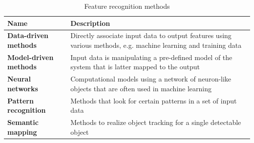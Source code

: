 \begin{table}[htbp]
  \centering
  \caption{Feature recognition methods}
    \begin{tabular}{lp{7cm}}
    \toprule
    \textbf{Name} & \textbf{Description} \\
    \midrule
    \textbf{Data-driven  methods} & Directly associate input data to output features using various methods, e.g. machine learning and training data \\
    \textbf{Model-driven methods} & Input data is manipulating a pre-defined model of the system that is latter mapped to the output \\
    \textbf{Neural networks} & Computational models using a network of neuron-like objects that are often used in machine learning \\
    \textbf{Pattern recognition} & Methods that look for certain patterns in a set of input data \\
    \textbf{Semantic mapping} & Methods to realize object tracking for a single detectable object \\
    \bottomrule
    \end{tabular}%
  \label{tab:rel_feature}%
\end{table}%


